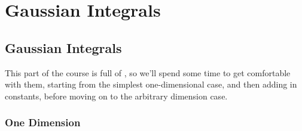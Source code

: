 \documentclass[fleqn]{NotesClass}
\newcommand{\interaction}{\symrm{I}}
\begin{document}
    
    
    
    
    
    
    
    
    
    
    
    
    
    
    
    
    
    
    
    
    
    
    
    
    
    
    
    
    
    
    
    
    
    
    
    
    
    
    
    
    
    
    
    
    
    
    
    
    
    
    
    
    
    \renewcommand{\interaction}{\text{int}}
    
    \part{Gaussian Integrals}
    \chapter{Gaussian Integrals}
    This part of the course is full of , so we'll spend some time to get comfortable with them, starting from the simplest one-dimensional case, and then adding in constants, before moving on to the arbitrary dimension case.
    \section{One Dimension}
\end{document}
